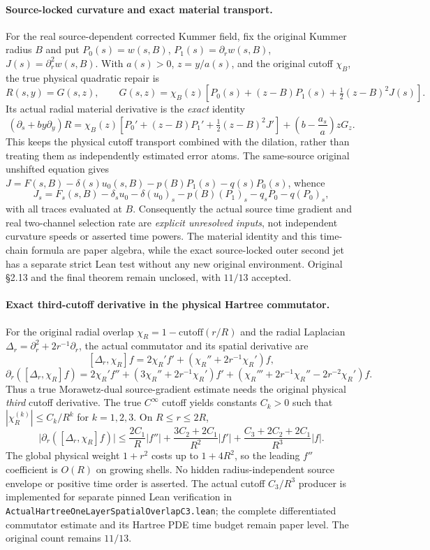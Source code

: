 \documentclass[11pt]{amsart}
\begin{document}
\paragraph{Source-locked curvature and exact material transport.}
For the real source-dependent corrected Kummer field,
fix the original Kummer radius \(B\) and put
\(P_0(s)=w(s,B)\), \(P_1(s)=\partial_r w(s,B)\),
\(J(s)=\partial_r^2w(s,B)\).
With \(a(s)>0\), \(z=y/a(s)\), and the original
cutoff \(\chi_B\), the true physical quadratic repair is
\[
 R(s,y)=G(s,z),\qquad
 G(s,z)=\chi_B(z)
 [P_0(s)+(z-B)P_1(s)+\tfrac12(z-B)^2J(s)].
\]
Its actual radial material derivative is the
\emph{exact} identity
\[
 (\partial_s+by\partial_y)R
 =\chi_B(z)[P_0'+(z-B)P_1'+\tfrac12(z-B)^2J']
 +\left(b-\frac{a_s}{a}\right)zG_z.
\]
This keeps the physical cutoff transport combined with
the dilation, rather than treating them as independently
estimated error atoms. The same-source original unshifted
equation gives
\(J=F(s,B)-\delta(s)u_0(s,B)
 -p(B)P_1(s)-q(s)P_0(s)\), whence
\[
 J_s=F_s(s,B)-\delta_su_0-\delta(u_0)_s
     -p(B)(P_1)_s-q_sP_0-q(P_0)_s,
\]
with all traces evaluated at \(B\).
Consequently the actual source time gradient and real
two-channel selection rate are \emph{explicit unresolved
inputs}, not independent curvature speeds or asserted
time powers. The material identity and this time-chain
formula are paper algebra, while the exact source-locked
outer second jet has a separate strict Lean test
without any new original environment.
Original §2.13 and the final theorem remain unclosed,
with \(11/13\) accepted.


\paragraph{Exact third-cutoff derivative in the physical Hartree commutator.}
For the original radial overlap \(\chi_R=1-\mathrm{cutoff}(r/R)\)
and the radial Laplacian \(\Delta_r=\partial_r^2+2r^{-1}\partial_r\),
the actual commutator and its spatial derivative are
\[
 [\Delta_r,\chi_R]f
 =2\chi_R'f'+(\chi_R''+2r^{-1}\chi_R')f,
\]
\[
 \partial_r([\Delta_r,\chi_R]f)
 =2\chi_R'f''+(3\chi_R''+2r^{-1}\chi_R')f'
  +(\chi_R'''+2r^{-1}\chi_R''-2r^{-2}\chi_R')f.
\]
Thus a true Morawetz-dual source-gradient estimate needs the
original physical \emph{third} cutoff derivative. The
true \(C^\infty\) cutoff yields constants \(C_k>0\)
such that \(|\chi_R^{(k)}|\le C_k/R^k\) for
\(k=1,2,3\). On \(R\le r\le2R\),
\[
 \bigl|\partial_r([\Delta_r,\chi_R]f)\bigr|
 \le\frac{2C_1}{R}|f''|
 +\frac{3C_2+2C_1}{R^2}|f'|
 +\frac{C_3+2C_2+2C_1}{R^3}|f|.
\]
The global physical weight \(1+r^2\) costs up
to \(1+4R^2\), so the leading \(f''\)
coefficient is \(O(R)\) on growing shells.
No hidden radius-independent source envelope
or positive time order is asserted.
The actual cutoff \(C_3/R^3\) producer is
implemented for separate pinned Lean verification
in
\texttt{ActualHartreeOneLayerSpatialOverlapC3.lean};
the complete differentiated commutator estimate
and its Hartree PDE time budget remain paper level.
The original count remains \(11/13\).
\end{document}
